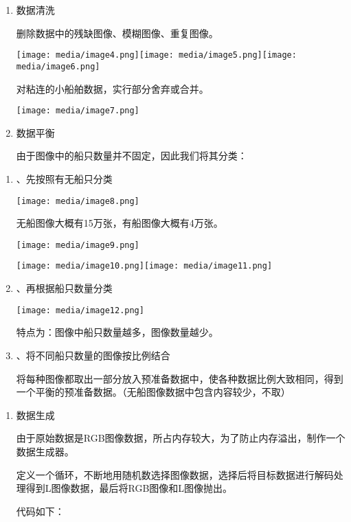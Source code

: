 \begin{enumerate}
\def\labelenumi{\arabic{enumi}.}
\setcounter{enumi}{1}
\item
  数据清洗

  删除数据中的残缺图像、模糊图像、重复图像。

  \texttt{[image: media/image4.png]}\texttt{[image: media/image5.png]}\texttt{[image: media/image6.png]}

  对粘连的小船舶数据，实行部分舍弃或合并。

  \texttt{[image: media/image7.png]}
\item
  数据平衡

  由于图像中的船只数量并不固定，因此我们将其分类：
\end{enumerate}

\begin{enumerate}
\def\labelenumi{\arabic{enumi}.}
\item
  、先按照有无船只分类

  \texttt{[image: media/image8.png]}

  无船图像大概有15万张，有船图像大概有4万张。

  \texttt{[image: media/image9.png]}

  \texttt{[image: media/image10.png]}\texttt{[image: media/image11.png]}
\item
  、再根据船只数量分类

  \texttt{[image: media/image12.png]}

  特点为：图像中船只数量越多，图像数量越少。
\item
  、将不同船只数量的图像按比例结合

  将每种图像都取出一部分放入预准备数据中，使各种数据比例大致相同，得到一个平衡的预准备数据。（无船图像数据中包含内容较少，不取）
\end{enumerate}

\begin{enumerate}
\def\labelenumi{\arabic{enumi}.}
\setcounter{enumi}{1}
\item
  数据生成

  由于原始数据是RGB图像数据，所占内存较大，为了防止内存溢出，制作一个数据生成器。

  定义一个循环，不断地用随机数选择图像数据，选择后将目标数据进行解码处理得到L图像数据，最后将RGB图像和L图像抛出。

  代码如下：
\end{enumerate}

